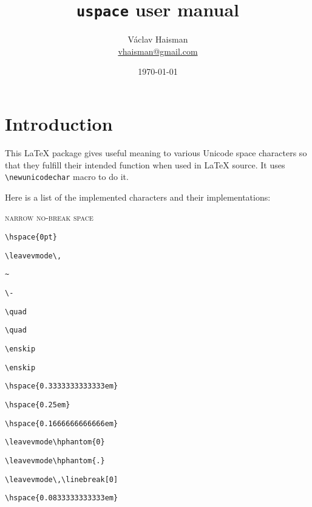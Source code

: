 \documentclass[paper=B5,DIV=calc,parskip=half]{scrartcl}
\author{Václav Haisman\texorpdfstring{%
    \\{\small\href{mailto:vhaisman+uspace@gmail.com?subject=[uspace]}{vhaisman@gmail.com}}}{}}
\date{\today}
\title{\texttt{uspace} user manual}
\newcommand{\zwsp}{\textsc{zero width space}}
\newcommand{\nnbsp}{\textsc{narrow no-break space}}
\newcommand{\nbsp}{\textsc{non-breaking space}}
\newcommand{\shy}{\textsc{soft hyphen}}
\newcommand{\enquad}{\textsc{en quad}}
\newcommand{\enspaceC}{\textsc{en space}}
\newcommand{\emquad}{\textsc{em quad}}
\newcommand{\emspaceC}{\textsc{em space}}
\newcommand{\threePerEm}{\textsc{three-per-em space}}
\newcommand{\fourPerEm}{\textsc{four-per-em space}}
\newcommand{\sixPerEm}{\textsc{six-per-em space}}
\newcommand{\figuresp}{\textsc{figure space}}
\newcommand{\punctsp}{\textsc{punctuation space}}
\newcommand{\thinsp}{\textsc{thin space}}
\newcommand{\hairsp}{\textsc{hair space}}
\begin{document}
\begin{titlepage}
  \maketitle
\end{titlepage}

\tableofcontents

\section{Introduction}%
%
This \LaTeX{} package gives useful meaning to various Unicode space
characters so that they fulfill their intended function when used in \LaTeX{}
source. It uses \lstinline|\newunicodechar| macro to do it.

Here is a list of the implemented characters
  and their implementations:\nobreak%
\begin{labeling}[\quad]{\nnbsp{}}
\item[\zwsp] \lstinline|\hspace{0pt}|
\item[\nnbsp] \lstinline|\leavevmode\,|
\item[\nbsp{\footnotemark[1]}] \lstinline|~|
\item[\shy{\footnotemark[1]}] \lstinline|\-|
\item[\emquad{\footnotemark[2]}] \lstinline|\quad|
\item[\emspaceC{\footnotemark[2]}] \lstinline|\quad|
\item[\enquad{\footnotemark[3]}] \lstinline|\enskip|
\item[\enspaceC{\footnotemark[3]}] \lstinline|\enskip|
\item[\threePerEm] \lstinline|\hspace{0.3333333333333em}|
\item[\fourPerEm] \lstinline|\hspace{0.25em}|
\item[\sixPerEm] \lstinline|\hspace{0.1666666666666em}|
\item[\figuresp] \lstinline|\leavevmode\hphantom{0}|
\item[\punctsp] \lstinline|\leavevmode\hphantom{.}|
\item[\thinsp] \lstinline|\leavevmode\,\linebreak[0]|
\item[\hairsp] \lstinline|\hspace{0.0833333333333em}|
\end{labeling}
\end{document}
